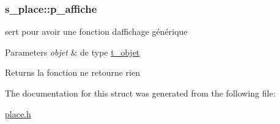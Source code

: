 \subsubsection[{\texorpdfstring{p\+\_\+affiche}{p_affiche}}]{\setlength{\rightskip}{0pt plus 5cm}s\+\_\+place\+::p\+\_\+affiche}\hypertarget{structs__place_a3876d28b2a22e373f0f820d723ef4dbd}{}\label{structs__place_a3876d28b2a22e373f0f820d723ef4dbd}


sert pour avoir une fonction d\textquotesingle{}affichage générique 


\begin{DoxyParams}{Parameters}
{\em objet} & de type \hyperlink{structt__objet}{t\+\_\+objet} \\
\hline
\end{DoxyParams}
\begin{DoxyReturn}{Returns}
la fonction ne retourne rien 
\end{DoxyReturn}


The documentation for this struct was generated from the following file\+:\begin{DoxyCompactItemize}
\item 
\hyperlink{place_8h}{place.\+h}\end{DoxyCompactItemize}
